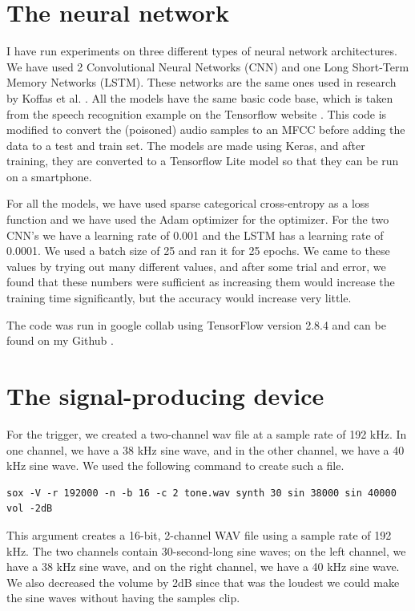 \documentclass{report}
\theoremstyle{definition}
\theoremstyle{remark}
\begin{document}
\section{The neural network}
I have run experiments on three different types of neural network architectures. We have used 2 Convolutional Neural Networks (CNN) and one Long Short-Term Memory Networks (LSTM). These networks are the same ones used in research by Koffas et al. \cite{CYHI}. All the models have the same basic code base, which is taken from the speech recognition example on the Tensorflow website \cite{TenserflowExample}. This code is modified to convert the (poisoned) audio samples to an MFCC before adding the data to a test and train set. The models are made using Keras, and after training, they are converted to a Tensorflow Lite model so that they can be run on a smartphone. 

For all the models, we have used sparse categorical cross-entropy as a loss function and we have used the Adam optimizer for the optimizer. For the two CNN's we have a learning rate of 0.001 and the LSTM has a learning rate of 0.0001. We used a batch size of 25 and ran it for 25 epochs. We came to these values by trying out many different values, and after some trial and error, we found that these numbers were sufficient as increasing them would increase the training time significantly, but the accuracy would increase very little.

The code was run in google collab using TensorFlow version 2.8.4 and can be found on my Github \cite{GH}.

\section{The signal-producing device}
For the trigger, we created a two-channel wav file at a sample rate of 192 kHz. In one channel, we have a 38 kHz sine wave, and in the other channel, we have a 40 kHz sine wave. We used the following command to create such a file.
\begin{lstlisting}
sox -V -r 192000 -n -b 16 -c 2 tone.wav synth 30 sin 38000 sin 40000 vol -2dB
\end{lstlisting}
This argument creates a 16-bit, 2-channel WAV file using a sample rate of 192 kHz. The two channels contain 30-second-long sine waves; on the left channel, we have a 38 kHz sine wave, and on the right channel, we have a 40 kHz sine wave. We also decreased the volume by 2dB since that was the loudest we could make the sine waves without having the samples clip.
\end{document}

